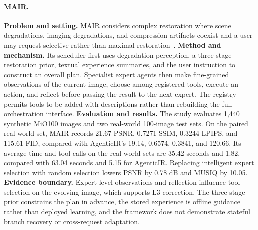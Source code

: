 \paragraph{MAIR.}
\textbf{Problem and setting.} MAIR considers complex restoration where scene degradations, imaging degradations, and compression artifacts coexist and a user may request selective rather than maximal restoration~\cite{avg250309403}. \textbf{Method and mechanism.} Its scheduler first uses degradation perception, a three-stage restoration prior, textual experience summaries, and the user instruction to construct an overall plan. Specialist expert agents then make fine-grained observations of the current image, choose among registered tools, execute an action, and reflect before passing the result to the next expert. The registry permits tools to be added with descriptions rather than rebuilding the full orchestration interface. \textbf{Evaluation and results.} The study evaluates 1,440 synthetic MiO100 images and two real-world 100-image test sets. On the paired real-world set, MAIR records 21.67 PSNR, 0.7271 SSIM, 0.3244 LPIPS, and 115.61 FID, compared with AgenticIR's 19.14, 0.6574, 0.3841, and 120.66. Its average time and tool calls on the real-world sets are 35.42 seconds and 1.82, compared with 63.04 seconds and 5.15 for AgenticIR. Replacing intelligent expert selection with random selection lowers PSNR by 0.78 dB and MUSIQ by 10.05. \textbf{Evidence boundary.} Expert-level observations and reflection influence tool selection on the evolving image, which supports L3 correction. The three-stage prior constrains the plan in advance, the stored experience is offline guidance rather than deployed learning, and the framework does not demonstrate stateful branch recovery or cross-request adaptation.

